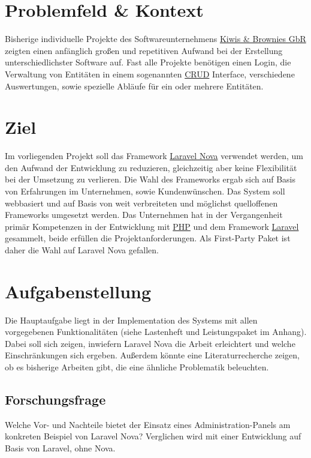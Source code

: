 \documentclass[a4paper,11pt]{article}%
\renewcommand{\\}{\vspace*{0.5\baselineskip} \newline}
\begin{document}
    \pagestyle{fancy}

    \newpage


    \section{Problemfeld \& Kontext}
    Bisherige individuelle Projekte des Softwareunternehmens \href{https://kiwis-and-brownies.de}{Kiwis \& Brownies GbR} zeigten einen anfänglich großen und repetitiven Aufwand bei der Erstellung unterschiedlichster Software auf.
    Fast alle Projekte benötigen einen Login, die Verwaltung von Entitäten in einem sogenannten \href{https://www.educative.io/blog/crud-operations}{CRUD} Interface, verschiedene Auswertungen, sowie spezielle Abläufe für ein oder mehrere Entitäten.


    \section{Ziel}
    Im vorliegenden Projekt soll das Framework \href{https://nova.laravel.com}{Laravel Nova} verwendet werden, um den Aufwand der Entwicklung zu reduzieren, gleichzeitig aber keine Flexibilität bei der Umsetzung zu verlieren.
    Die Wahl des Frameworks ergab sich auf Basis von Erfahrungen im Unternehmen, sowie Kundenwünschen.
    Das System soll webbasiert und auf Basis von weit verbreiteten und möglichst quelloffenen Frameworks umgesetzt werden.
    Das Unternehmen hat in der Vergangenheit primär Kompetenzen in der Entwicklung mit \href{https://www.php.net}{PHP} und dem Framework \href{https://laravel.com}{Laravel} gesammelt, beide erfüllen die Projektanforderungen.
    Als First-Party Paket ist daher die Wahl auf Laravel Nova gefallen.


    \section{Aufgabenstellung}
    Die Hauptaufgabe liegt in der Implementation des Systems mit allen vorgegebenen Funktionalitäten (siehe Lastenheft und Leistungspaket im Anhang).
    Dabei soll sich zeigen, inwiefern Laravel Nova die Arbeit erleichtert und welche Einschränkungen sich ergeben.
    Außerdem könnte eine Literaturrecherche zeigen, ob es bisherige Arbeiten gibt, die eine ähnliche Problematik beleuchten.

    \subsection{Forschungsfrage}
    Welche Vor- und Nachteile bietet der Einsatz eines Administration-Panels am konkreten Beispiel von Laravel Nova?
    Verglichen wird mit einer Entwicklung auf Basis von Laravel, ohne Nova.
\end{document}

